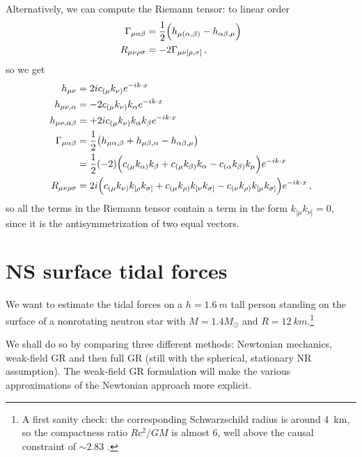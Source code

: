\documentclass[main.tex]{subfiles}
\begin{document}
Alternatively, we can compute the Riemann tensor: to linear order 
%
\begin{align}
\Gamma_{\mu \alpha \beta } &= \frac{1}{2} \qty(h_{\mu  (\alpha , \beta )} - h_{\alpha \beta , \mu })  \\
R_{\mu \nu \rho \sigma } &= - 2 \Gamma_{\mu \nu [\rho , \sigma ]}
\,,
\end{align}
%
so we get 
%
\begin{align}
h_{\mu \nu } &= 2 i c_{(\mu } k_{\nu )} e^{-i k \cdot x}  \\
h_{\mu \nu , \alpha } &= - 2 c_{(\mu } k_{\nu )} k_\alpha e^{-i k \cdot x} \\
h_{\mu \nu , \alpha \beta } &= + 2 i c_{(\mu } k_{\nu )} k_\alpha k_\beta e^{- i k \cdot x} \\
\Gamma_{\mu \alpha \beta } &= \frac{1}{2} \qty( h_{\mu \alpha , \beta } + h_{\mu \beta, \alpha } - h_{\alpha \beta , \mu })  \\
&= \frac{1}{2} (-2) \qty(
    c_{(\mu } k_{\alpha  )} k_\beta + 
    c_{(\mu } k_{\beta   )} k_\alpha -
    c_{(\alpha  } k_{\beta   )} k_\mu 
)
e^{-i k \cdot x}  \\
R_{\mu \nu \rho \sigma } &=
2 i \qty(
    c_{(\mu } k_{\nu)}  k_{[\rho} k_{\sigma ]} +  
    c_{(\mu } k_{\rho)} k_{[\nu } k_{\sigma ]} -
    c_{(\nu } k_{\rho)} k_{[\mu } k_{\sigma ]}    
) e^{- i k \cdot x}
\,,
\end{align}
%
so all the terms in the Riemann tensor contain a term in the form \(k_{[\mu } k_{\nu ]} = 0\), since it is the antisymmetrization of two equal vectors. 

\section{NS surface tidal forces}

We want to estimate the tidal forces on a \(h =\SI{1.6}{m}\) tall person standing on the surface of a nonrotating neutron star with \(M = 1.4 M_{\odot}\) and \(R = \SI{12}{km}\).\footnote{A first sanity check: the corresponding Schwarzschild radius is around \SI{4}{km}, so the compactness ratio \(R c^2 / G M\) is almost 6, well above the causal constraint of \(\sim 2.83\) \cite[eq.\ 5, fig.\ 2]{lattimerNeutronStarObservations2007a}.}

We shall do so by comparing three different methods: Newtonian mechanics, weak-field GR and then full GR (still with the spherical, stationary NR assumption).
The weak-field GR formulation will make the various approximations of the Newtonian approach more explicit. 
\end{document}
